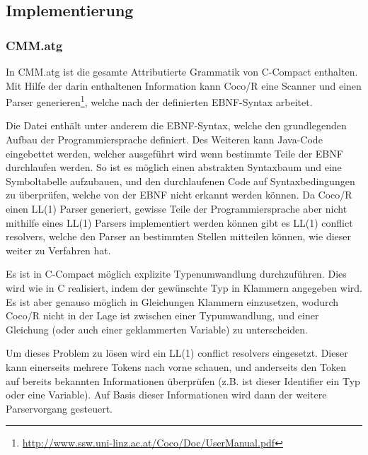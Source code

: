 

\subsection{Implementierung}

\subsubsection{CMM.atg}

In CMM.atg ist die gesamte Attributierte Grammatik von C-Compact enthalten. Mit Hilfe der darin enthaltenen Information kann Coco/R eine Scanner und einen Parser generieren\footnote{\url{http://www.ssw.uni-linz.ac.at/Coco/Doc/UserManual.pdf}}, welche nach der definierten EBNF-Syntax arbeitet.

Die Datei enth\"alt unter anderem die EBNF-Syntax, welche den grundlegenden Aufbau der Programmiersprache definiert. Des Weiteren kann Java-Code eingebettet werden, welcher ausgef\"uhrt wird wenn bestimmte Teile der EBNF durchlaufen werden. So ist es m\"oglich einen abstrakten Syntaxbaum und eine Symboltabelle aufzubauen, und den durchlaufenen Code auf Syntaxbedingungen zu \"uberpr\"ufen, welche von der EBNF nicht erkannt werden k\"onnen. Da Coco/R einen LL(1) Parser generiert, gewisse Teile der Programmiersprache aber nicht mithilfe eines LL(1) Parsers implementiert werden k\"onnen gibt es LL(1) conflict resolvers, welche den Parser an bestimmten Stellen mitteilen k\"onnen, wie dieser weiter zu Verfahren hat.


Es ist in C-Compact m\"oglich explizite Typenumwandlung durchzuf\"uhren. Dies wird wie in C realisiert, indem der gew\"unschte Typ in Klammern angegeben wird. Es ist aber genauso m\"oglich in Gleichungen Klammern einzusetzen, wodurch Coco/R nicht in der Lage ist zwischen einer Typumwandlung, und einer Gleichung (oder auch einer geklammerten Variable) zu unterscheiden.

Um dieses Problem zu l\"osen wird ein LL(1) conflict resolvers eingesetzt. Dieser kann einerseits mehrere Tokens nach vorne schauen, und anderseits den Token auf bereits bekannten Informationen \"uberpr\"ufen (z.B. ist dieser Identifier ein Typ oder eine Variable). Auf Basis dieser Informationen wird dann der weitere Parservorgang gesteuert.

